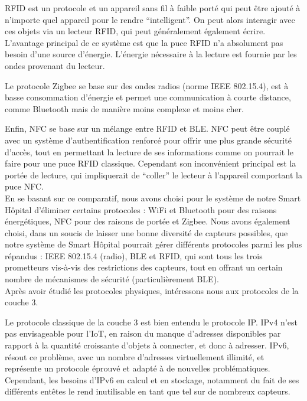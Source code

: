 \documentclass{article}
\begin{document}
RFID est un protocole et un appareil sans fil à faible porté qui peut être ajouté à n’importe quel appareil pour le rendre “intelligent”. On peut alors interagir avec ces objets via un lecteur RFID, qui peut généralement également écrire. L’avantage principal de ce système est que la puce RFID n’a absolument pas besoin d’une source d’énergie. L’énergie nécessaire à la lecture est fournie par les ondes provenant du lecteur.

Le protocole Zigbee se base sur des ondes radios (norme IEEE 802.15.4), est à basse consommation d’énergie et permet une communication à courte distance, comme Bluetooth mais de manière moins complexe et moins cher.

Enfin, NFC se base sur un mélange entre RFID et BLE. NFC peut être couplé avec un système d’authentification renforcé pour offrir une plus grande sécurité d’accès, tout en permettant la lecture de ses informations comme on pourrait le faire pour une puce RFID classique. Cependant son inconvénient principal est la portée de lecture, qui impliquerait de “coller” le lecteur à l’appareil comportant la puce NFC.
\\

En se basant sur ce comparatif, nous avons choisi pour le système de notre Smart Hôpital d’éliminer certains protocoles : WiFi et Bluetooth pour des raisons énergétiques, NFC pour des raisons de portée et Zigbee. Nous avons également choisi, dans un soucis de laisser une bonne diversité de capteurs possibles, que notre système de Smart Hôpital pourrait gérer différents protocoles parmi les plus répandus : IEEE 802.15.4 (radio), BLE et RFID, qui sont tous les trois prometteurs vis-à-vis des restrictions des capteurs, tout en offrant un certain nombre de mécanismes de sécurité (particulièrement BLE).
\\

Après avoir étudié les protocoles physiques, intéressons nous aux protocoles de la couche 3.

Le protocole classique de la couche 3 est bien entendu le protocole IP. IPv4 n’est pas envisageable pour l’IoT, en raison du manque d’adresses disponibles par rapport à la quantité croissante d’objets à connecter, et donc à adresser. IPv6, résout ce problème, avec un nombre d’adresses virtuellement illimité, et représente un protocole éprouvé et adapté à de nouvelles problématiques. Cependant, les besoins d’IPv6 en calcul et en stockage, notamment du fait de ses différents entêtes le rend inutilisable en tant que tel sur de nombreux capteurs.
\end{document}
